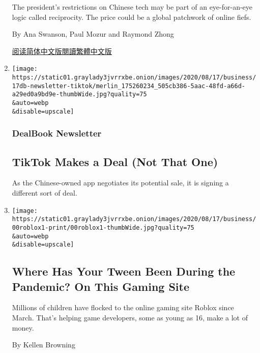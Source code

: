 \begin{enumerate}
  The president's restrictions on Chinese tech may be part of an
  eye-for-an-eye logic called reciprocity. The price could be a global
  patchwork of online fiefs.

  By Ana Swanson, Paul Mozur and Raymond Zhong

  \href{https://cn.nytimes3xbfgragh.onion/technology/20200818/trump-tiktok-wechat-ban/}{阅读简体中文版}\href{https://cn.nytimes3xbfgragh.onion/technology/20200818/trump-tiktok-wechat-ban/zh-hant/}{閱讀繁體中文版}
\item
  \href{/2020/08/17/business/dealbook/tiktok-unitedmasters-music.html}{}

  \texttt{[image: https://static01.graylady3jvrrxbe.onion/images/2020/08/17/business/17db-newsletter-tiktok/merlin\_175260234\_505cb386-5aac-48fd-a66d-a29ed0a9bd9e-thumbWide.jpg?quality=75\\\&auto=webp\\\&disable=upscale]}

  \hypertarget{dealbook-newsletter-3}{%
  \subsubsection{DealBook Newsletter}\label{dealbook-newsletter-3}}

  \hypertarget{tiktok-makes-a-deal-not-that-one}{%
  \subsection{TikTok Makes a Deal (Not That
  One)}\label{tiktok-makes-a-deal-not-that-one}}

  As the Chinese-owned app negotiates its potential sale, it is signing
  a different sort of deal.
\item
  \href{/2020/08/16/technology/roblox-tweens-videogame-coronavirus.html}{}

  \texttt{[image: https://static01.graylady3jvrrxbe.onion/images/2020/08/17/business/00roblox1-print/00roblox1-thumbWide.jpg?quality=75\\\&auto=webp\\\&disable=upscale]}

  \hypertarget{where-has-your-tween-been-during-the-pandemic-on-this-gaming-site}{%
  \subsection{Where Has Your Tween Been During the Pandemic? On This
  Gaming
  Site}\label{where-has-your-tween-been-during-the-pandemic-on-this-gaming-site}}

  Millions of children have flocked to the online gaming site Roblox
  since March. That's helping game developers, some as young as 16, make
  a lot of money.

  By Kellen Browning
\end{enumerate}

